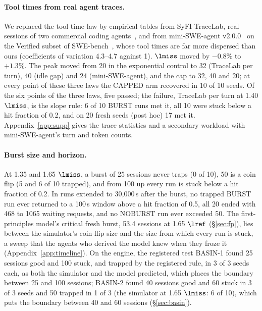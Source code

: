 \paragraph{Tool times from real agent traces.} We replaced the tool-time law by empirical tables from SyFI TraceLab, real sessions of two commercial coding agents~\citep{zhu2026tracelab}, and from mini-SWE-agent v2.0.0~\citep{sweagent2026miniswe,yang2024sweagent} on the Verified subset of SWE-bench~\citep{jimenez2024swebench,openai2024swebenchverified}, whose tool times are far more dispersed than ours (coefficients of variation 4.3--4.7 against 1). $\lmiss$ moved by $-0.8\%$ to $+1.3\%$. The peak moved from 20 in the exponential control to 32 (TraceLab per turn), 40 (idle gap) and 24 (mini-SWE-agent), and the cap to 32, 40 and 20; at every point of these three laws the CAPPED arm recovered in 10 of 10 seeds. Of the six points of the three laws, five passed; the failure, TraceLab per turn at 1.40 $\lmiss$, is the slope rule: 6 of 10 BURST runs met it, all 10 were stuck below a hit fraction of 0.2, and on 20 fresh seeds (post hoc) 17 met it. Appendix~\ref{app:supp} gives the trace statistics and a secondary workload with mini-SWE-agent's turn and token counts.

\paragraph{Burst size and horizon.} At 1.35 and 1.65 $\lmiss$, a burst of 25 sessions never traps (0 of 10), 50 is a coin flip (5 and 6 of 10 trapped), and from 100 up every run is stuck below a hit fraction of 0.2. In runs extended to 30,000\,s after the burst, no trapped BURST run ever returned to a 100\,s window above a hit fraction of 0.5, all 20 ended with 468 to 1065 waiting requests, and no NOBURST run ever exceeded 50. The first-principles model's critical fresh burst, 53.4 sessions at 1.65 $\lref$ (\S\ref{sec:fp}), lies between the simulator's coin-flip size and the size from which every run is stuck, a sweep that the agents who derived the model knew when they froze it (Appendix~\ref{app:timeline}). On the engine, the registered test BASIN-1 found 25 sessions good and 100 stuck, and trapped by the registered rule, in 3 of 3 seeds each, as both the simulator and the model predicted, which places the boundary between 25 and 100 sessions; BASIN-2 found 40 sessions good and 60 stuck in 3 of 3 seeds and 50 trapped in 1 of 3 (the simulator at 1.65 $\lmiss$: 6 of 10), which puts the boundary between 40 and 60 sessions (\S\ref{sec:basin}).

